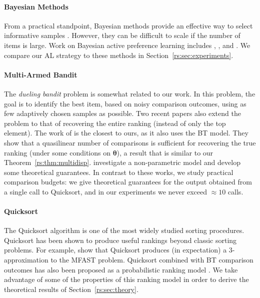 \paragraph{Bayesian Methods}
From a practical standpoint, Bayesian methods provide an effective way to select informative samples \citep{mackay1992bayesian}.
However, they can be difficult to scale if the number of items is large.
Work on Bayesian active preference learning includes
\citet{chu2005extensions}, \citet{houlsby2012collaborative}, \citet{salimans2012collaborative} and \citet{chen2013pairwise}.
We compare our AL strategy to these methods in Section~\ref{rs:sec:experiments}.

\paragraph{Multi-Armed Bandit}
The \emph{dueling bandit} problem \citep{yue2009karmed} is somewhat related to our work.
In this problem, the goal is to identify the best item, based on noisy comparison outcomes, using as few adaptively chosen samples as possible.
Two recent papers also extend the problem to that of recovering the entire ranking (instead of only the top element).
The work of \citet{szorenyi2015online} is the closest to ours, as it also uses the BT model.
They show that a quasilinear number of comparisons is sufficient for recovering the true ranking (under some conditions on $\bm{\theta}$), a result that is similar to our Theorem~\ref{rs:thm:multidisp}.
\citet{heckel2016active} investigate a non-parametric model and develop some theoretical guarantees.
In contrast to these works, we study practical comparison budgets: we give theoretical guarantees for the output obtained from a single call to Quicksort, and in our experiments we never exceed $\approx 10$ calls.

\paragraph{Quicksort}
The Quicksort algorithm \citep{hoare1962quicksort} is one of the most widely studied sorting procedures.
Quicksort has been shown to produce useful rankings beyond classic sorting problems.
For example, \citet{ailon2008aggregating} show that Quicksort produces (in expectation) a $3$-approximation to the MFAST problem.
Quicksort combined with BT comparison outcomes has also been proposed as a probabilistic ranking model \citep{ailon2008reconciling}.
We take advantage of some of the properties of this ranking model in order to derive the theoretical results of Section~\ref{rs:sec:theory}.
